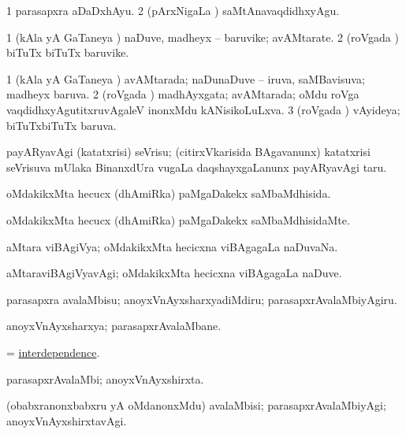 \noindent
\gl{\akirx}
\bmng
\bnum
\num{1} parasapxra aDaDxhAyu. 
\num{2} (pArxNigaLa \vi) saMtAnavaqdidhxyAgu. 
\enum
\emng
\eentry

\bentry
{}
\gl{\nA}
\bmng
\bnum
\num{1} (kAla yA GaTaneya \vi) naDuve, madheyx -- baruvike; avAMtarate. 
\num{2} (roVgada \vi) biTuTx biTuTx baruvike. 
\enum
\emng
\eentry

\bentry
{}
\gl{\gu}
\bmng
\bnum
\num{1} (kAla yA GaTaneya \vi) avAMtarada; naDunaDuve -- iruva, saMBavisuva; madheyx baruva. 
\num{2} (roVgada \vi) madhAyxgata; avAMtarada; oMdu roVga vaqdidhxyAgutitxruvAgaleV inonxMdu kANisikoLuLxva. 
\num{3} (roVgada \vi) vAyideya; biTuTxbiTuTx baruva. 
\enum
\emng
\eentry

\bentry
{}
\gl{\sakirx}
\bmng
payARyavAgi (katatxrisi) seVrisu; (citirxVkarisida BAgavanunx) katatxrisi seVrisuva mUlaka BinanxdUra \mo vugaLa daqshayxgaLanunx payARyavAgi taru. 
\emng
\eentry

\bentry
{}
\gl{\gu}
\bmng
oMdakikxMta hecucx (dhAmiRka) paMgaDakekx saMbaMdhisida. 
\emng
\eentry

\bentry
{}
\gl{\kirxvi}
\bmng
oMdakikxMta hecucx (dhAmiRka) paMgaDakekx saMbaMdhisidaMte. 
\emng
\eentry

\bentry
{}
\gl{\gu}
\bmng
aMtara viBAgiVya; oMdakikxMta hecicxna viBAgagaLa naDuvaNa. 
\emng
\eentry

\bentry
{}
\gl{\kirxvi}
\bmng
aMtaraviBAgiVyavAgi; oMdakikxMta hecicxna viBAgagaLa naDuve. 
\emng
\eentry

\bentry
{}
\gl{\akirx}
\bmng
parasapxra avalaMbisu; anoyxVnAyxsharxyadiMdiru; parasapxrAvalaMbiyAgiru. 
\emng
\eentry

\bentry
{}
\gl{\nA}
\bmng
anoyxVnAyxsharxya; parasapxrAvalaMbane. 
\emng
\eentry

\bentry
{}
\gl{\nA}
\bmng
= \hyperlink{interdependence}{interdependence}. 
\emng
\eentry

\bentry
{}
\gl{\gu}
\bmng
parasapxrAvalaMbi; anoyxVnAyxshirxta. 
\emng
\eentry

\bentry
{}
\gl{\kirxvi}
\bmng
(obabxranonxbabxru yA oMdanonxMdu) avalaMbisi; parasapxrAvalaMbiyAgi; anoyxVnAyxshirxtavAgi. 
\emng
\eentry

